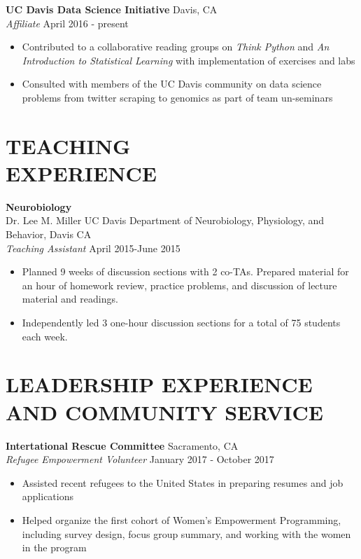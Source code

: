 \documentclass[line,margin,10pt]{res}
\begin{document}
\begin{resume}
\textbf{UC Davis Data Science Initiative} \hfill  Davis, CA \\
{\sl Affiliate} \hfill April 2016 - present
\begin{itemize} \itemsep -2pt
\item Contributed to a collaborative reading groups on {\sl Think Python} and {\sl An Introduction to Statistical Learning}  with implementation of exercises and labs 
\item Consulted with members of the UC Davis community on data science problems from twitter scraping to genomics as part of team un-seminars
\end{itemize}
 
  \section{TEACHING\\EXPERIENCE} 
 \textbf{Neurobiology}\\
 Dr. Lee M. Miller \hfill UC Davis Department of Neurobiology, Physiology, and Behavior, Davis CA\\
 {\sl Teaching Assistant} \hfill April 2015-June 2015
 \begin{itemize}\itemsep -2pt
 \item Planned 9 weeks of discussion sections with 2 co-TAs. Prepared material for an hour of homework review, practice problems, and discussion of lecture material and readings.
 \item Independently led 3 one-hour discussion sections for a total of 75 students each week.
 \end{itemize}

 \section{LEADERSHIP EXPERIENCE AND COMMUNITY SERVICE}
 \textbf{Intertational Rescue Committee}\hfill
Sacramento, CA\\
{\sl Refugee Empowerment Volunteer} \hfill January 2017 - October 2017
\begin{itemize}
\item Assisted recent refugees to the United States in preparing resumes and job applications
\item Helped organize the first cohort of Women's Empowerment Programming, including survey design, focus group summary, and working with the women in the program
\end{itemize}


\end{resume}
\end{document}
